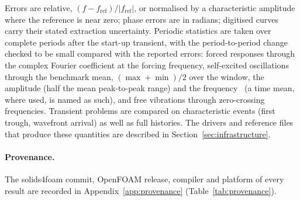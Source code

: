 Errors are relative, $(f - f_\mathrm{ref})/|f_\mathrm{ref}|$, or normalised by a characteristic amplitude where the reference is near zero; phase errors are in radians; digitised curves carry their stated extraction uncertainty.
Periodic statistics are taken over complete periods after the start-up transient, with the period-to-period change checked to be small compared with the reported errors: forced responses through the complex Fourier coefficient at the forcing frequency, self-excited oscillations through the benchmark mean, $(\max+\min)/2$ over the window, the amplitude (half the mean peak-to-peak range) and the frequency~\citep{Turek2006} (a time mean, where used, is named as such), and free vibrations through zero-crossing frequencies.
Transient problems are compared on characteristic events (first trough, wavefront arrival) as well as full histories.
The drivers and reference files that produce these quantities are described in Section~\ref{sec:infrastructure}.
\paragraph{Provenance.}
The solids4foam commit, OpenFOAM release, compiler and platform of every result are recorded in Appendix~\ref{app:provenance} (Table~\ref{tab:provenance}).
